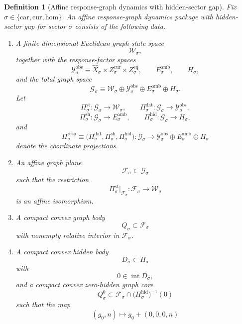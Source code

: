 \documentclass[11pt]{article}
\newcommand{\Car}{\mathrm{car}}
\newcommand{\Cur}{\mathrm{cur}}
\newcommand{\Hom}{\mathrm{hom}}
\newcommand{\VisibleAffine}[1]{\widehat X_{#1}}
\newcommand{\DataSpace}[1]{\mathcal Y_{#1}^{\mathrm{obs}}}
\newcommand{\AmbientTarget}[1]{E_{#1}^{\mathrm{amb}}}
\newcommand{\GapSpace}[1]{H_{#1}}
\newcommand{\GapBody}[1]{D_{#1}}
\newcommand{\GraphState}[1]{\mathcal W_{#1}}
\newcommand{\GraphSpace}[1]{\mathcal G_{#1}}
\newcommand{\GraphAffine}[1]{\mathcal F_{#1}}
\newcommand{\GraphBody}[1]{Q_{#1}}
\newcommand{\GraphZeroBody}[1]{Q_{#1}^{0}}
\newcommand{\StateProj}[1]{\Pi_{#1}^{\mathrm{st}}}
\newcommand{\RespProj}[1]{\Pi_{#1}^{\mathrm{resp}}}
\newcommand{\GraphDataProj}[1]{\Pi_{#1}^{\mathrm{dat}}}
\newcommand{\GraphShellProj}[1]{\Pi_{#1}^{\mathrm{sh}}}
\newcommand{\GraphHiddenProj}[1]{\Pi_{#1}^{\mathrm{hid}}}
\newtheorem{definition}{Definition}
\begin{document}
\begin{definition}[Affine response-graph dynamics with hidden-sector gap]
\label{def:graph}
Fix \(\sigma\in\{\Car,\Cur,\Hom\}\). An \emph{affine response-graph dynamics package with hidden-sector gap} for sector \(\sigma\) consists of the following data.
\begin{enumerate}
    \item A finite-dimensional Euclidean graph-state space
    \[
    \GraphState{\sigma},
    \]
    together with the response-factor spaces
    \[
    \DataSpace{\sigma}
    \equiv
    \VisibleAffine{\sigma}\times Z_{\sigma}^{\mathrm{cur}}\times Z_{\sigma}^{\mathrm{eq}},
    \qquad
    \AmbientTarget{\sigma},
    \qquad
    \GapSpace{\sigma},
    \]
    and the total graph space
    \[
    \GraphSpace{\sigma}
    \equiv
    \GraphState{\sigma}\oplus
    \DataSpace{\sigma}\oplus
    \AmbientTarget{\sigma}\oplus
    \GapSpace{\sigma}.
    \]
    Let
    \[
    \StateProj{\sigma}:\GraphSpace{\sigma}\to \GraphState{\sigma},
    \qquad
    \GraphDataProj{\sigma}:\GraphSpace{\sigma}\to \DataSpace{\sigma},
    \]
    \[
    \GraphShellProj{\sigma}:\GraphSpace{\sigma}\to \AmbientTarget{\sigma},
    \qquad
    \GraphHiddenProj{\sigma}:\GraphSpace{\sigma}\to \GapSpace{\sigma},
    \]
    and
    \[
    \RespProj{\sigma}
    \equiv
    \bigl(
    \GraphDataProj{\sigma},
    \GraphShellProj{\sigma},
    \GraphHiddenProj{\sigma}
    \bigr):
    \GraphSpace{\sigma}\to
    \DataSpace{\sigma}\oplus \AmbientTarget{\sigma}\oplus \GapSpace{\sigma}
    \]
    denote the coordinate projections.
    \item An affine graph plane
    \[
    \GraphAffine{\sigma}\subset \GraphSpace{\sigma}
    \]
    such that the restriction
    \[
    \StateProj{\sigma}\big|_{\GraphAffine{\sigma}}:
    \GraphAffine{\sigma}\to \GraphState{\sigma}
    \]
    is an affine isomorphism.
    \item A compact convex graph body
    \[
    \GraphBody{\sigma}\subset \GraphAffine{\sigma}
    \]
    with nonempty relative interior in \(\GraphAffine{\sigma}\).
    \item A compact convex hidden body
    \[
    \GapBody{\sigma}\subset \GapSpace{\sigma}
    \]
    with
    \[
    0\in\operatorname{int}\GapBody{\sigma},
    \]
    and a compact convex zero-hidden graph core
    \[
    \GraphZeroBody{\sigma}\subset
    \GraphAffine{\sigma}\cap \bigl(\GraphHiddenProj{\sigma}\bigr)^{-1}(0)
    \]
    such that the map
    \begin{equation}
    (g_{0},n)\longmapsto g_{0}+(0,0,0,n)

\end{equation}
\end{enumerate}
\end{definition}
\end{document}

